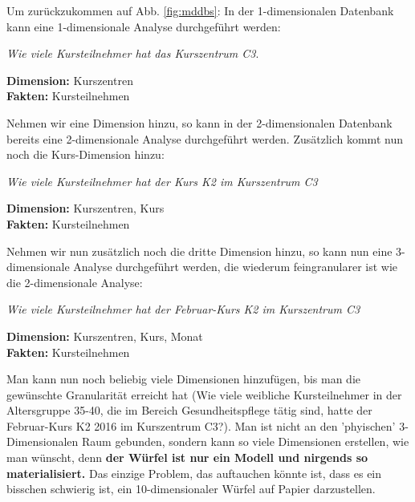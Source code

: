 \documentclass[a4paper, 11pt, nofootinbib]{article}
\begin{document}
\vspace{10px}

\noindent Um zurückzukommen auf Abb. \ref{fig:mddbs}: In der 1-dimensionalen Datenbank kann eine 1-dimensionale Analyse durchgeführt werden: \\

\centerline{\textit{Wie viele Kursteilnehmer hat das Kurszentrum C3}.} 

\vspace{10px}

\noindent \textbf{Dimension: } Kurszentren \\
\noindent \textbf{Fakten: } Kursteilnehmen

\vspace{10px}

\noindent Nehmen wir eine Dimension hinzu, so kann in der 2-dimensionalen Datenbank bereits eine 2-dimensionale Analyse durchgeführt werden. Zusätzlich kommt nun noch die Kurs-Dimension hinzu: \\

\centerline{\textit{Wie viele Kursteilnehmer hat der Kurs K2 im Kurszentrum C3}}

\vspace{10px}

\noindent \textbf{Dimension: } Kurszentren, Kurs \\
\noindent \textbf{Fakten: } Kursteilnehmen

\vspace{10px}

\noindent Nehmen wir nun zusätzlich noch die dritte Dimension hinzu, so kann nun eine 3-dimensionale Analyse durchgeführt werden, die wiederum feingranularer ist wie die 2-dimensionale Analyse: \\

\centerline{\textit{Wie viele Kursteilnehmer hat der Februar-Kurs K2 im Kurszentrum C3}}

\vspace{10px}

\noindent \textbf{Dimension: } Kurszentren, Kurs, Monat \\
\noindent \textbf{Fakten: } Kursteilnehmen

\vspace{10px}

\noindent Man kann nun noch beliebig viele Dimensionen hinzufügen, bis man die gewünschte Granularität erreicht hat (Wie viele weibliche Kursteilnehmer in der Altersgruppe 35-40, die im Bereich Gesundheitspflege tätig sind, hatte der Februar-Kurs K2 2016 im Kurszentrum C3?). Man ist nicht an den 'phyischen' 3-Dimensionalen Raum gebunden, sondern kann so viele Dimensionen erstellen, wie man wünscht, denn \textbf{der Würfel ist nur ein Modell und nirgends so materialisiert.} Das einzige Problem, das auftauchen könnte ist, dass es ein bisschen schwierig ist, ein 10-dimensionaler Würfel auf Papier darzustellen.
\end{document}
